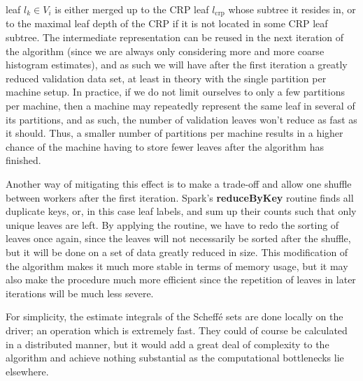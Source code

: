 \documentclass{report}
\begin{document}
leaf $l_k \in V_i$ is either merged up to the CRP leaf $l_{\text{crp}}$ whose subtree it resides in,
or to the maximal leaf depth of the CRP if it is not located in some CRP leaf subtree. 
The intermediate representation 
can be reused in the next iteration of the algorithm (since we are always only considering more and more coarse histogram estimates), and as such we will have after the first iteration a greatly reduced validation data set,
at least in theory with the single partition per machine setup. In practice, if we do not limit ourselves to only a few partitions per machine, then a machine may repeatedly represent the same leaf in several of its partitions, and
as such, the number of validation leaves won't reduce as fast as it should. Thus, a smaller number of partitions per machine results in a higher chance of the machine having to store fewer leaves after the algorithm
has finished.

Another way of mitigating this effect is to make a trade-off and allow one shuffle between workers after the first iteration.
Spark's \textbf{reduceByKey} routine finds all duplicate keys, or, in this case leaf labels,
and sum up their counts such that only unique leaves are left. By applying the routine, we have
to redo the sorting of leaves once again, since the leaves will not necessarily be sorted after
the shuffle, but it will be done
on a set of data greatly reduced in size. 
This modification of the algorithm makes it much more stable in terms of memory usage, but it
may also make the procedure much more efficient since the repetition of leaves in later iterations will be much less severe.

For simplicity, the estimate integrals of the Scheffé sets are done locally on the driver; an operation which is extremely fast. They could of course be calculated in a distributed manner, but it would add a great deal
of complexity to the algorithm and achieve nothing substantial as the computational bottlenecks lie elsewhere.
\end{document}
